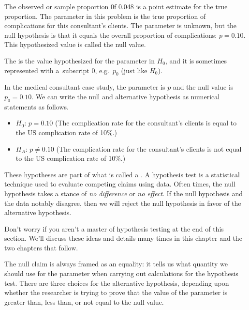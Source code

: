 The observed or sample proportion 0f 0.048 is a point estimate for the true proportion. The parameter in this problem is the true proportion of complications for this consultant's clients. The parameter is unknown, but the null hypothesis is that it equals the overall proportion of complications: $p = 0.10$. This hypothesized value is called the null value.

\begin{termBox}{
The  is the value hypothesized for the parameter in $H_0$, and it is sometimes represented with a~subscript 0, e.g.~$p_0$ (just like $H_0$).}
\end{termBox}

In the medical consultant case study, the parameter is $p$ and the null value is $p_0 = 0.10$. We can write the null and alternative hypothesis as numerical statements as follows.
\begin{itemize}
\item $H_0$: $p=0.10$ (The complication rate for the consultant's clients is equal to the US complication rate of 10\%.)
\item $H_A$: $p \neq 0.10$ (The complication rate for the consultant's clients is not equal to the US complication rate of 10\%.)
\end{itemize}

\begin{termBox}{
These hypotheses are part of what is called a . A hypothesis test is a statistical technique used to evaluate competing claims using data. Often times, the null hypothesis takes a stance of \emph{no difference} or \emph{no effect}. If the null hypothesis and the data notably disagree, then we will reject the null hypothesis in favor of the alternative hypothesis.\vspace{3mm}

Don't worry if you aren't a master of hypothesis testing at the end of this section. We'll discuss these ideas and details many times in this chapter and the two chapters that follow.}
\end{termBox}

The null claim is always framed as an equality: it tells us what quantity we should use for the parameter when carrying out calculations for the hypothesis test. There are three choices for the alternative hypothesis, depending upon whether the researcher is trying to prove that the value of the parameter is greater than, less than, or not equal to the null value.

